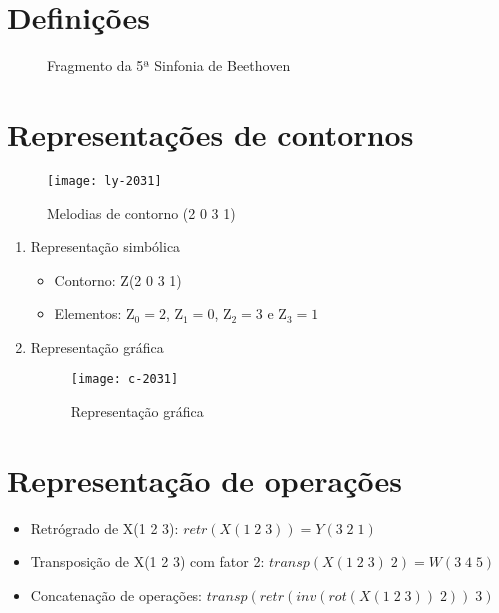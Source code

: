 \documentclass[brazil,12pt,plain]{article}
\begin{document}
\section{Definições}
\label{sec:definicoes}

\begin{figure}[!h]
  \centering
  \subfloat[Contorno]{
    \texttt{[image: c-3120]}
  }
  \caption{Fragmento da 5ª Sinfonia de Beethoven}
\end{figure}

\section{Representações de contornos}
\label{sec:repr-de-cont}

\begin{figure}[!h]
  \centering
  \texttt{[image: ly-2031]}    
  \caption{Melodias de contorno (2 0 3 1)}
  \label{fig:melodias}
\end{figure}

\begin{enumerate}
\item Representação simbólica
  \begin{itemize}
  \item Contorno: Z(2 0 3 1)
  \item Elementos: Z$_0=2$, Z$_1=0$, Z$_2=3$ e Z$_3=1$
  \end{itemize}
\item Representação gráfica
  \begin{figure}[!h]
    \centering
    \texttt{[image: c-2031]}
    \caption{Representação gráfica}
    \label{fig:representacao-grafica}
  \end{figure}
\end{enumerate}

\section{Representação de operações}
\label{sec:repr-de-oper}

\begin{itemize}
\item Retrógrado de X(1 2 3): $retr(X(1\;2\;3))=Y(3\;2\;1)$
\item Transposição de X(1 2 3) com fator 2: $transp(X(1\;2\;3)\;2)=W(3\;4\;5)$
\item Concatenação de operações: $transp(retr(inv(rot(X(1\;2\;3))\;2))\;3)$
\end{itemize}
\end{document}
